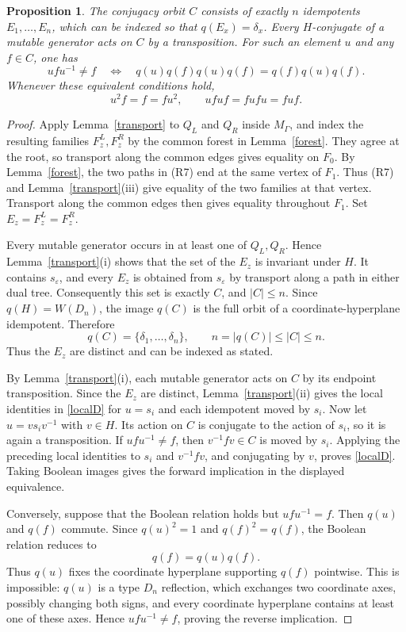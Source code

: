\documentclass[a4paper, 12pt, reqno]{amsart}
\newtheorem{proposition}[theorem]{Proposition}
\theoremstyle{definition}
\newcommand{\eps}{\varepsilon}
\begin{document}
\begin{proposition}\label{orbit}
The conjugacy orbit $C$ consists of exactly $n$ idempotents $E_1,\ldots,E_n$, which can be indexed so that $q(E_x)=\delta_x$. Every $H$-conjugate of a mutable generator acts on $C$ by a transposition. For such an element $u$ and any $f\in C$, one has
\[
ufu^{-1}\ne f \quad\Longleftrightarrow\quad  q(u)q(f)q(u)q(f)=q(f)q(u)q(f).
\]
Whenever these equivalent conditions hold,
\begin{equation}\label{localD}
u^2f=f=fu^2, \qquad  ufuf=fufu=fuf.
\end{equation}
\end{proposition}

\begin{proof}
Apply Lemma~\ref{transport} to $Q_L$ and $Q_R$ inside $M_\Gamma$, and index the resulting families $F_z^L,F_z^R$ by the common forest in Lemma~\ref{forest}. They agree at the root, so transport along the common edges gives equality on $F_0$. By Lemma~\ref{forest}, the two paths in (R7) end at the same vertex of $F_1$. Thus (R7) and Lemma~\ref{transport}(iii) give equality of the two families at that vertex. Transport along the common edges then gives equality throughout $F_1$. Set $E_z=F_z^L=F_z^R$.

Every mutable generator occurs in at least one of $Q_L,Q_R$. Hence Lemma~\ref{transport}(i) shows that the set of the $E_z$ is invariant under $H$. It contains $s_\eps$, and every $E_z$ is obtained from $s_\eps$ by transport along a path in either dual tree. Consequently this set is exactly $C$, and $|C|\le n$. Since $q(H)=W(D_n)$, the image $q(C)$ is the full orbit of a coordinate-hyperplane idempotent. Therefore
\[
q(C)=\{\delta_1,\ldots,\delta_n\}, \qquad n=|q(C)|\le |C|\le n.
\]
Thus the $E_z$ are distinct and can be indexed as stated.

By Lemma~\ref{transport}(i), each mutable generator acts on $C$ by its endpoint transposition. Since the $E_z$ are distinct, Lemma~\ref{transport}(ii) gives the local identities in \eqref{localD} for $u=s_i$ and each idempotent moved by $s_i$. Now let $u=vs_iv^{-1}$ with $v\in H$. Its action on $C$ is conjugate to the action of $s_i$, so it is again a transposition. If $ufu^{-1}\ne f$, then $v^{-1}fv\in C$ is moved by $s_i$. Applying the preceding local identities to $s_i$ and $v^{-1}fv$, and conjugating by $v$, proves \eqref{localD}. Taking Boolean images gives the forward implication in the displayed equivalence.

Conversely, suppose that the Boolean relation holds but $ufu^{-1}=f$. Then $q(u)$ and $q(f)$ commute. Since $q(u)^2=1$ and $q(f)^2=q(f)$, the Boolean relation reduces to
\[
q(f)=q(u)q(f).
\]
Thus $q(u)$ fixes the coordinate hyperplane supporting $q(f)$ pointwise. This is impossible: $q(u)$ is a type $D_n$ reflection, which exchanges two coordinate axes, possibly changing both signs, and every coordinate hyperplane contains at least one of these axes. Hence $ufu^{-1}\ne f$, proving the reverse implication.
\end{proof}
\end{document}

